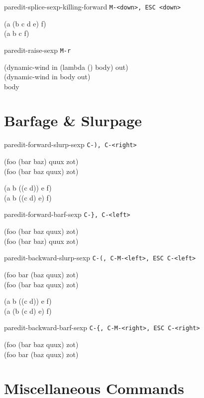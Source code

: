 \documentclass[landscape,a3paper]{article}
\begin{document}
\begin{multicols}{4}
paredit-splice-sexp-killing-forward \texttt{M-<down>, ESC <down>}

\ttfamily
(a (b c\cursor{} d e) f)\\
(a b c\cursor{} f)
\rmfamily

paredit-raise-sexp \texttt{M-r}

\ttfamily
(dynamic-wind in (lambda () \cursor body) out)\\
(dynamic-wind in \cursor body out)\\
\cursor body
\rmfamily

    \section*{Barfage \& Slurpage}

paredit-forward-slurp-sexp \texttt{C-), C-<right>}

\ttfamily
(foo (bar \cursor baz) quux zot)\\
(foo (bar \cursor baz quux) zot)

(a b ((c\cursor{} d)) e f)\\
(a b ((c\cursor{} d) e) f)
\rmfamily

paredit-forward-barf-sexp \texttt{C-\}, C-<left>}

\ttfamily
(foo (bar \cursor baz quux) zot)\\
(foo (bar \cursor baz) quux zot)
\rmfamily

paredit-backward-slurp-sexp \texttt{C-(, C-M-<left>, ESC C-<left>}

\ttfamily
(foo bar (baz\cursor{} quux) zot)\\
(foo (bar\cursor{} baz quux) zot)

(a b ((c\cursor{} d)) e f)\\
(a (b (c\cursor{} d) e) f)
\rmfamily

paredit-backward-barf-sexp \texttt{C-\{, C-M-<right>, ESC C-<right>}

\ttfamily
(foo (bar baz \cursor quux) zot)\\
(foo bar (baz \cursor quux) zot)
\rmfamily

    \section*{Miscellaneous Commands}

  \end{multicols}
\end{document}
